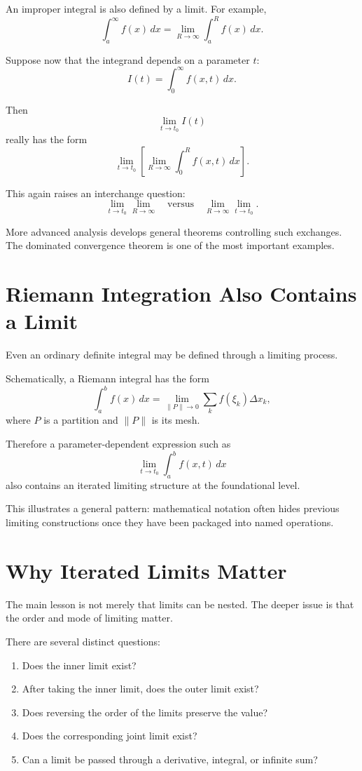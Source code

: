 \documentclass{essay}
\begin{document}
An improper integral is also defined by a limit. For example,
\[ \int_{a}^{\infty} f(x)\,dx = \lim_{R\to\infty} \int_{a}^{R} f(x)\,dx. \]

Suppose now that the integrand depends on a parameter \(t\):
\[ I(t) = \int_{0}^{\infty} f(x,t)\,dx. \]

Then
\[ \lim_{t\to t_{0}}I(t) \]
really has the form
\[ \lim_{t\to t_{0}} \left[ \lim_{R\to\infty} \int_{0}^{R} f(x,t)\,dx \right]. \]

This again raises an interchange question:
\[ \lim_{t\to t_{0}}\lim_{R\to\infty} \quad\text{versus}\quad \lim_{R\to\infty}\lim_{t\to t_{0}}. \]

More advanced analysis develops general theorems controlling such exchanges. The dominated convergence theorem is one of the most important examples.

\section{Riemann Integration Also Contains a Limit}

Even an ordinary definite integral may be defined through a limiting process.

Schematically, a Riemann integral has the form
\[ \int_{a}^{b} f(x)\,dx = \lim_{\lVert P\rVert\to0} \sum_{k}f(\xi_{k})\Delta x_{k}, \]
where \(P\) is a partition and \(\lVert P\rVert\) is its mesh.

Therefore a parameter-dependent expression such as
\[ \lim_{t\to t_{0}} \int_{a}^{b} f(x,t)\,dx \]
also contains an iterated limiting structure at the foundational level.

This illustrates a general pattern: mathematical notation often hides previous limiting constructions once they have been packaged into named operations.

\section{Why Iterated Limits Matter}

The main lesson is not merely that limits can be nested. The deeper issue is that the order and mode of limiting matter.

There are several distinct questions:

\begin{enumerate}
  \item Does the inner limit exist?
  \item After taking the inner limit, does the outer limit exist?
  \item Does reversing the order of the limits preserve the value?
  \item Does the corresponding joint limit exist?
  \item Can a limit be passed through a derivative, integral, or infinite sum?
\end{enumerate}
\end{document}
